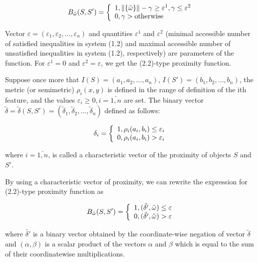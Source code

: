 \begin{equation}
B_{\tilde{\omega}}(S, S') = \left\{ 
  \begin{array}{l l}
    1, \|\{\tilde{\omega}\}\| - \gamma \geq \varepsilon^1,\gamma \leq \varepsilon^2 \\
    0, \gamma > \text{otherwise}
  \end{array} \right.
\end{equation}

Vector $\varepsilon = (\varepsilon_1, \varepsilon_2, \ldots , \varepsilon_n)$ and 
quantities $\varepsilon^1$ and $\varepsilon^2$ (minimal accessible 
number of satisfied inequalities in system (1.2) and maximal accessible number 
of unsatisfied inequalities in system (1.2), respectively) are parameters of 
the function. For $\varepsilon^1 = 0$ and $\varepsilon^2 = \varepsilon$, we get the (2.2)-type proximity function.

Suppose once more that $I(S) = (a_1, a_2, \ldots, a_n)$,
$I(S') = (b_1, b_2, \ldots, b_n)$, the metric (or semimetric) $\rho_i(x, y)$
is defined in the range of definition of the ith feature, and the values $\varepsilon_i \geq 0, i = \bar{1, n}$ are set. 
The binary vector $\tilde{\delta} = \tilde{\delta}(S, S') = (\tilde{\delta}_1, \tilde{\delta}_2, \ldots, \tilde{\delta}_n)$ defined as follows: 

\begin{equation}
\delta_i = \left\{ 
  \begin{array}{l l}
    1, \rho_i(a_i,b_i) \leq \varepsilon_i \\
    0, \rho_i(a_i,b_i) > \varepsilon_i
  \end{array} \right.
\end{equation}

where $i = \bar{1,n}$, is called a characteristic vector of the proximity 
of objects $S$ and $S'$.

By using a characteristic vector of proximity, we can rewrite the expression for 
(2.2)-type proximity function as

\begin{equation}
B_{\tilde{\omega}}(S, S') = \left\{ 
  \begin{array}{l l}
    1, (\tilde{\delta'}, \tilde{\omega}) \leq \varepsilon \\
    0, (\tilde{\delta'}, \tilde{\omega}) > \varepsilon
  \end{array} \right.
\end{equation}

where $\tilde{\delta'}$ is a binary vector obtained by the coordinate-wise negation of vector 
$\tilde{\delta} $ and $(\alpha, \beta)$ is a scalar product of the vectors $\alpha$ and $\beta$ which is 
equal to the sum of their coordinatewise multiplications. 

